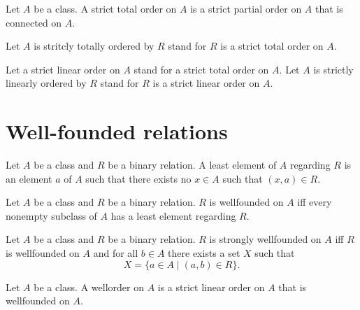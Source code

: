 \documentclass[../../set-theory/set-theory.tex]{subfiles}
\begin{document}
  \begin{forthel}
    \begin{definition}
      Let $A$ be a class.
      A strict total order on $A$ is a strict partial order on $A$ that is
      connected on $A$.
    \end{definition}

    Let $A$ is stritcly totally ordered by $R$ stand for $R$ is a strict total
    order on $A$.

    Let a strict linear order on $A$ stand for a strict total order on $A$.
    Let $A$ is strictly linearly ordered by $R$ stand for $R$ is a strict
    linear order on $A$.
  \end{forthel}


  \section{Well-founded relations}

  \begin{forthel}
    \begin{definition}
      Let $A$ be a class and $R$ be a binary relation.
      A least element of $A$ regarding $R$ is an element $a$ of $A$ such that
      there exists no $x \in A$ such that $(x,a) \in R$.
    \end{definition}
  \end{forthel}

  \begin{forthel}
    \begin{definition}
      Let $A$ be a class and $R$ be a binary relation.
      $R$ is wellfounded on $A$ iff every nonempty subclass of $A$ has a
      least element regarding $R$.
    \end{definition}
  \end{forthel}

  \begin{forthel}
    \begin{definition}
      Let $A$ be a class and $R$ be a binary relation.
      $R$ is strongly wellfounded on $A$ iff $R$ is wellfounded on $A$ and for
      all $b \in A$ there exists a set $X$ such that
      \[ X = \{ a \in A \mid (a,b) \in R \}. \]
    \end{definition}
  \end{forthel}

  \begin{forthel}
    \begin{definition}
      Let $A$ be a class.
      A wellorder on $A$ is a strict linear order on $A$ that is wellfounded on
      $A$.
    \end{definition}
  \end{forthel}
\end{document}

